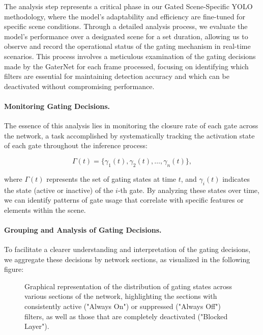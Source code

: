 The analysis step represents a critical phase in our Gated Scene-Specific YOLO methodology, where the model's adaptability and efficiency are fine-tuned for specific scene conditions. Through a detailed analysis process, we evaluate the model's performance over a designated scene for a set duration, allowing us to observe and record the operational status of the gating mechanism in real-time scenarios. This process involves a meticulous examination of the gating decisions made by the GaterNet for each frame processed, focusing on identifying which filters are essential for maintaining detection accuracy and which can be deactivated without compromising performance.

\paragraph{Monitoring Gating Decisions.} The essence of this analysis lies in monitoring the closure rate of each gate across the network, a task accomplished by systematically tracking the activation state of each gate throughout the inference process:

\begin{equation}
\Gamma(t) = \{\gamma_{1}(t), \gamma_{2}(t), \ldots, \gamma_{n}(t)\},
\label{eq:gating_states_time}
\end{equation}

where \(\Gamma(t)\) represents the set of gating states at time \(t\), and \(\gamma_{i}(t)\) indicates the state (active or inactive) of the \(i\)-th gate. By analyzing these states over time, we can identify patterns of gate usage that correlate with specific features or elements within the scene.

\paragraph{Grouping and Analysis of Gating Decisions.} To facilitate a clearer understanding and interpretation of the gating decisions, we aggregate these decisions by network sections, as visualized in the following figure:

\begin{figure}[htbp]
\centering

\caption{Graphical representation of the distribution of gating states across various sections of the network, highlighting the sections with consistently active ("Always On") or suppressed ("Always Off") filters, as well as those that are completely deactivated ("Blocked Layer").}
\label{fig:gating_analysis}
\end{figure}

